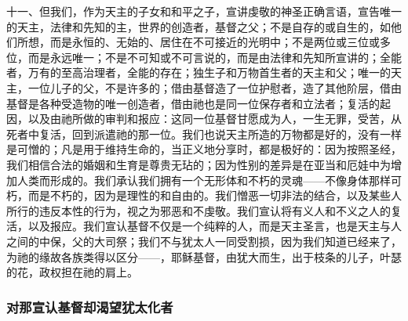 十一、但我们，作为天主的子女和和平之子，宣讲虔敬的神圣正确言语，宣告唯一的天主，法律和先知的主，世界的创造者，基督之父；不是自存的或自生的，如他们所想，而是永恒的、无始的、居住在不可接近的光明中；不是两位或三位或多位，而是永远唯一；不是不可知或不可言说的，而是由法律和先知所宣讲的；全能者，万有的至高治理者，全能的存在；独生子和万物首生者的天主和父；唯一的天主，一位儿子的父，不是许多的；借由基督造了一位护慰者，造了其他阶层，借由基督是各种受造物的唯一创造者，借由祂也是同一位保存者和立法者；复活的起因，以及由祂所做的审判和报应：这同一位基督甘愿成为人，一生无罪，受苦，从死者中复活，回到派遣祂的那一位。我们也说天主所造的万物都是好的，没有一样是可憎的；凡是用于维持生命的，当正义地分享时，都是极好的：因为按照圣经， 我们相信合法的婚姻和生育是尊贵无玷的；因为性别的差异是在亚当和厄娃中为增加人类而形成的。我们承认我们拥有一个无形体和不朽的灵魂——不像身体那样可朽，而是不朽的，因为是理性的和自由的。我们憎恶一切非法的结合，以及某些人所行的违反本性的行为，视之为邪恶和不虔敬。我们宣认将有义人和不义之人的复活，以及报应。我们宣认基督不仅是一个纯粹的人，而是天主圣言，也是天主与人之间的中保，父的大司祭；我们不与犹太人一同受割损，因为我们知道已经来了，为祂的缘故各族类得以区分——，耶稣基督，由犹大而生，出于枝条的儿子，叶瑟的花，政权担在祂的肩上。\par


\subsubsection{对那宣认基督却渴望犹太化者}

